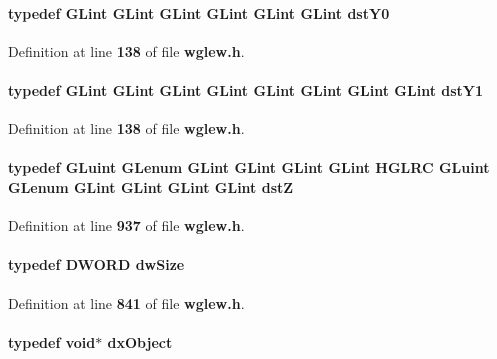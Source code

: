\paragraph[{dst\+Y0}]{\setlength{\rightskip}{0pt plus 5cm}typedef {\bf G\+Lint} {\bf G\+Lint} {\bf G\+Lint} {\bf G\+Lint} {\bf G\+Lint} {\bf G\+Lint} {\bf dst\+Y0}}\label{wglew_8h_a9775c48005abcfbd66faa8ac731ccb52}


Definition at line {\bf 138} of file {\bf wglew.\+h}.

\paragraph[{dst\+Y1}]{\setlength{\rightskip}{0pt plus 5cm}typedef {\bf G\+Lint} {\bf G\+Lint} {\bf G\+Lint} {\bf G\+Lint} {\bf G\+Lint} {\bf G\+Lint} {\bf G\+Lint} {\bf G\+Lint} {\bf dst\+Y1}}\label{wglew_8h_aa194c8cc99f1cbd48a6f45e2778661e5}


Definition at line {\bf 138} of file {\bf wglew.\+h}.

\paragraph[{dstZ}]{\setlength{\rightskip}{0pt plus 5cm}typedef {\bf G\+Luint} {\bf G\+Lenum} {\bf G\+Lint} {\bf G\+Lint} {\bf G\+Lint} {\bf G\+Lint} {\bf H\+G\+L\+RC} {\bf G\+Luint} {\bf G\+Lenum} {\bf G\+Lint} {\bf G\+Lint} {\bf G\+Lint} {\bf G\+Lint} {\bf dstZ}}\label{wglew_8h_ae76b8a730053e589df4d7abed4d47862}


Definition at line {\bf 937} of file {\bf wglew.\+h}.

\paragraph[{dw\+Size}]{\setlength{\rightskip}{0pt plus 5cm}typedef D\+W\+O\+RD {\bf dw\+Size}}\label{wglew_8h_a37d3bd6eb92958ad35ad75483212ca56}


Definition at line {\bf 841} of file {\bf wglew.\+h}.

\paragraph[{dx\+Object}]{\setlength{\rightskip}{0pt plus 5cm}typedef {\bf void}$\ast$ {\bf dx\+Object}}\label{wglew_8h_a84cbae22e541d1bd0d0824480594970f}


